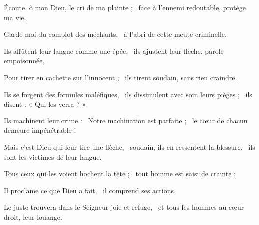 \item Écoute, ô mon Dieu, le cri de ma plainte ;~\psstar{} face à l'ennemi redoutable, protège ma vie.
\item Garde-moi du complot des méchants,~\psstar{} à l'abri de cette meute criminelle.
\item Ils affûtent leur langue comme une épée,~\psstar{} ils ajustent leur flèche, parole empoisonnée,
\item Pour tirer en cachette sur l'innocent ;~\psstar{} ils tirent soudain, sans rien craindre.
\item Ils se forgent des formules maléfiques,~\pscross{} ils dissimulent avec soin leurs pièges ;~\psstar{} ils disent : « Qui les verra ? »
\item Ils machinent leur crime :~\pscross{} Notre machination est parfaite ;~\psstar{} le cœur de chacun demeure impénétrable !
\item Mais c'est Dieu qui leur tire une flèche,~\pscross{} soudain, ils en ressentent la blessure,~\psstar{} ils sont les victimes de leur langue.
\item Tous ceux qui les voient hochent la tête ;~\psstar{} tout homme est saisi de crainte :
\item Il proclame ce que Dieu a fait,~\psstar{} il comprend ses actions.
\item Le juste trouvera dans le Seigneur joie et refuge,~\psstar{} et tous les hommes au cœur droit, leur louange.
